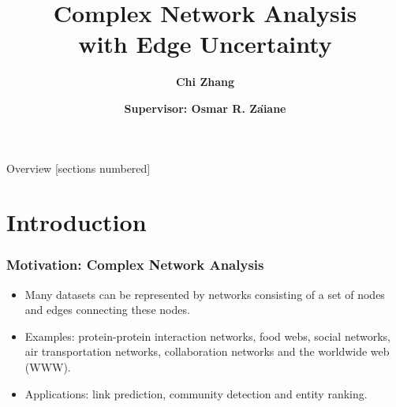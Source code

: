 \documentclass[9pt]{beamer}
\title{Complex Network Analysis \\
with Edge Uncertainty}
\date{\textbf{Supervisor: Osmar R. Za\"{\i}ane}}
\author{\textbf{Chi Zhang}}
\institute{March 27, 2018}
\begin{document}
\maketitle

\begin{frame}{Overview}
  [sections numbered]
  \vspace{0.1in}
  \tableofcontents
\end{frame}

\section{Introduction}

\begin{frame}
\frametitle{Motivation: Complex Network Analysis}
\begin{itemize}
\item Many datasets can be represented by networks consisting of a set of nodes and edges connecting these nodes. 
\item Examples: protein-protein interaction networks, food webs, social networks, air transportation networks, collaboration networks and the worldwide web (WWW).
\item Applications: link prediction, community detection and entity ranking.
\end{itemize}
\end{frame}
\end{document}
